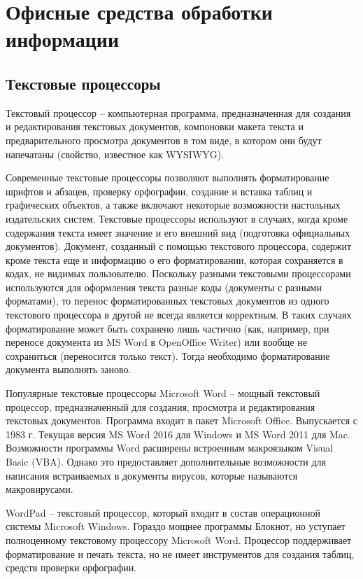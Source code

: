 \documentclass[a4paper]{article}
\begin{document}
\section{Офисные средства  обработки информации}

\subsection{Текстовые процессоры}
Текстовый процессор – компьютерная программа, предназначенная для создания и редактирования текстовых документов, компоновки макета текста и предварительного просмотра документов в том виде, в котором они будут напечатаны (свойство, известное как WYSIWYG).

Современные текстовые процессоры позволяют выполнять форматирование шрифтов и абзацев, проверку орфографии, создание и вставка таблиц и графических объектов, а также включают некоторые возможности настольных издательских систем. Текстовые процессоры используют в случаях, когда кроме содержания текста имеет значение и его внешний вид (подготовка официальных документов). Документ, созданный с помощью текстового процессора, содержит кроме текста еще и информацию о его форматировании, которая сохраняется в кодах, не видимых пользователю. Поскольку разными текстовыми процессорами используются для оформления текста разные коды (документы с разными форматами), то перенос форматированных текстовых документов из одного текстового процессора в другой не всегда является корректным. В таких случаях форматирование может быть сохранено лишь частично (как, например, при переносе документа из MS Word в OpenOffice Writer) или вообще не сохраниться (переносится только текст). Тогда необходимо форматирование документа выполнять заново.

Популярные текстовые процессоры Microsoft Word – мощный текстовый процессор, предназначенный для создания, просмотра и редактирования текстовых документов. Программа входит в пакет Microsoft Office. Выпускается с 1983 г. Текущая версия MS Word 2016 для Windows и MS Word 2011 для Mac. Возможности программы Word расширены встроенным макроязыком Visual Basic (VBA). Однако это предоставляет дополнительные возможности для написания встраиваемых в документы вирусов, которые называются макровирусами.

WordPad – текстовый процессор, который входит в состав операционной системы Microsoft Windows. Гораздо мощнее программы Блокнот, но уступает полноценному текстовому процессору Microsoft Word. Процессор поддерживает форматирование и печать текста, но не имеет инструментов для создания таблиц, средств проверки орфографии.
\end{document}
